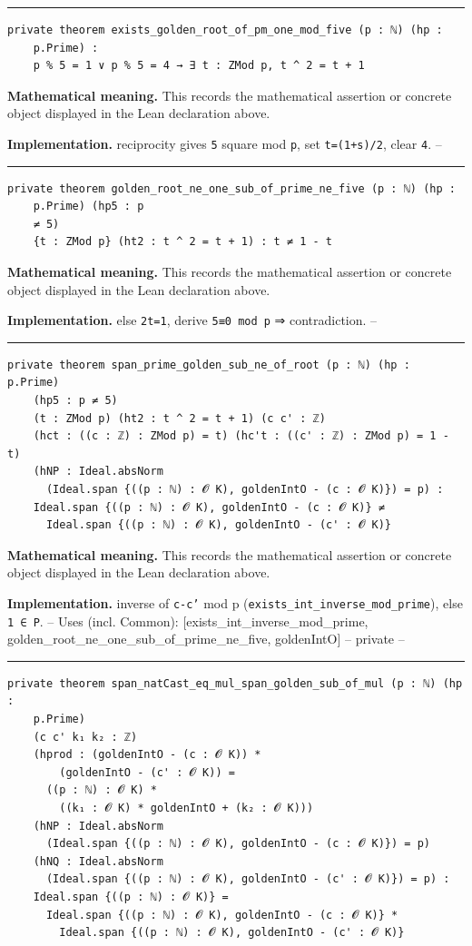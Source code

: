 \documentclass[UTF8,a4paper,11pt,fontset=fandol]{ctexart}
\theoremstyle{definition}
\newcommand{\statementsep}{\par\medskip\hrule\medskip}
\begin{document}
\statementsep
\begin{verbatim}
private theorem exists_golden_root_of_pm_one_mod_five (p : ℕ) (hp :
    p.Prime) :
    p % 5 = 1 ∨ p % 5 = 4 → ∃ t : ZMod p, t ^ 2 = t + 1
\end{verbatim}
\noindent\textbf{Mathematical meaning.} This records the mathematical assertion or concrete object displayed in the Lean declaration above.\par
\noindent\textbf{Implementation.} reciprocity gives \texttt{5} square mod \texttt{p}, set \texttt{t=(1+s)/\allowbreak{}2}, clear \texttt{4}. --\par
\statementsep
\begin{verbatim}
private theorem golden_root_ne_one_sub_of_prime_ne_five (p : ℕ) (hp :
    p.Prime) (hp5 : p
    ≠ 5)
    {t : ZMod p} (ht2 : t ^ 2 = t + 1) : t ≠ 1 - t
\end{verbatim}
\noindent\textbf{Mathematical meaning.} This records the mathematical assertion or concrete object displayed in the Lean declaration above.\par
\noindent\textbf{Implementation.} else \texttt{2t=1}, derive \texttt{5≡0 mod p} ⇒ contradiction. --\par
\statementsep
\begin{verbatim}
private theorem span_prime_golden_sub_ne_of_root (p : ℕ) (hp : p.Prime)
    (hp5 : p ≠ 5)
    (t : ZMod p) (ht2 : t ^ 2 = t + 1) (c c' : ℤ)
    (hct : ((c : ℤ) : ZMod p) = t) (hc't : ((c' : ℤ) : ZMod p) = 1 - t)
    (hNP : Ideal.absNorm
      (Ideal.span {((p : ℕ) : 𝓞 K), goldenIntO - (c : 𝓞 K)}) = p) :
    Ideal.span {((p : ℕ) : 𝓞 K), goldenIntO - (c : 𝓞 K)} ≠
      Ideal.span {((p : ℕ) : 𝓞 K), goldenIntO - (c' : 𝓞 K)}
\end{verbatim}
\noindent\textbf{Mathematical meaning.} This records the mathematical assertion or concrete object displayed in the Lean declaration above.\par
\noindent\textbf{Implementation.} inverse of \texttt{c-c'} mod p (\texttt{exists\_\allowbreak{}int\_\allowbreak{}inverse\_\allowbreak{}mod\_\allowbreak{}prime}), else \texttt{1 ∈ P}. -- Uses (incl. Common): [exists\_\allowbreak{}int\_\allowbreak{}inverse\_\allowbreak{}mod\_\allowbreak{}prime, golden\_\allowbreak{}root\_\allowbreak{}ne\_\allowbreak{}one\_\allowbreak{}sub\_\allowbreak{}of\_\allowbreak{}prime\_\allowbreak{}ne\_\allowbreak{}five, goldenIntO] -- private --\par
\statementsep
\begin{verbatim}
private theorem span_natCast_eq_mul_span_golden_sub_of_mul (p : ℕ) (hp :
    p.Prime)
    (c c' k₁ k₂ : ℤ)
    (hprod : (goldenIntO - (c : 𝓞 K)) *
        (goldenIntO - (c' : 𝓞 K)) =
      ((p : ℕ) : 𝓞 K) *
        ((k₁ : 𝓞 K) * goldenIntO + (k₂ : 𝓞 K)))
    (hNP : Ideal.absNorm
      (Ideal.span {((p : ℕ) : 𝓞 K), goldenIntO - (c : 𝓞 K)}) = p)
    (hNQ : Ideal.absNorm
      (Ideal.span {((p : ℕ) : 𝓞 K), goldenIntO - (c' : 𝓞 K)}) = p) :
    Ideal.span {((p : ℕ) : 𝓞 K)} =
      Ideal.span {((p : ℕ) : 𝓞 K), goldenIntO - (c : 𝓞 K)} *
        Ideal.span {((p : ℕ) : 𝓞 K), goldenIntO - (c' : 𝓞 K)}
\end{verbatim}
\end{document}
